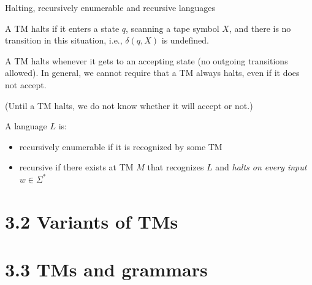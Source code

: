 \documentclass[handout]{beamer}
\begin{document}
\begin{frame}{Halting, recursively enumerable and recursive languages}
        
    \begin{definition}
        A TM \alert{halts} if it enters a state $q$, scanning a tape symbol $X$, and there is no transition in this situation, i.e., $\delta(q,X)$ is undefined.
    \end{definition}

    A TM halts whenever it gets to an accepting state (no outgoing transitions allowed). In general, we cannot require that a TM always halts, even if it does not accept.

    (Until a TM halts, we  do not know whether it will accept or not.)

    \smallskip

    \begin{definition}
        A language $L$ is:
        \begin{itemize}
            \item \alert{recursively enumerable} if it is recognized by some TM
            \item \alert{recursive} if there exists at TM $M$ that recognizes $L$ and \emph{halts on every input} $w\in\Sigma^*$
        \end{itemize}
    \end{definition}
  
\end{frame}


\section{3.2 Variants of TMs}


\section{3.3 TMs and grammars}
\end{document}
